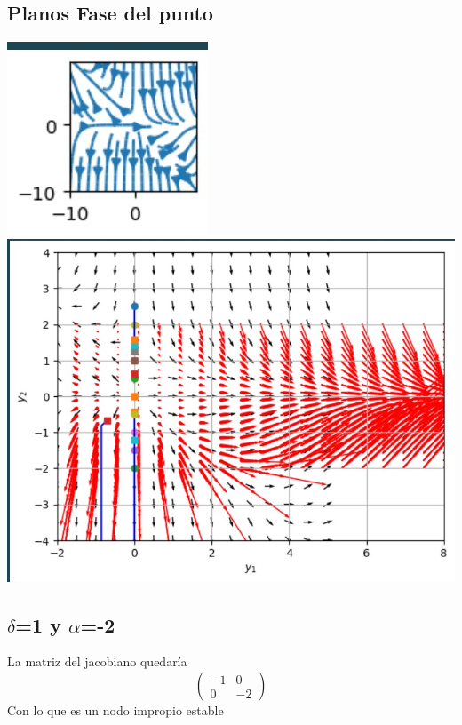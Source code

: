 \documentclass{article}
\begin{document}
         \subsection*{Planos Fase del punto }
         \noindent
         \includegraphics{isoclinas 2jpg.jpg}
          \includegraphics{Campo vectorail de d=-1 a1 .jpg}
        
      \subsection*{$\delta$=1 y $\alpha$=-2}
       
        La matriz del jacobiano quedaría
        \[
         \left(
         \begin{array}{lc}
           -1 & 0\\
           0 & -2
         \end{array}
         \right)
         \]         
         Con lo que es un nodo impropio estable
\end{document}
